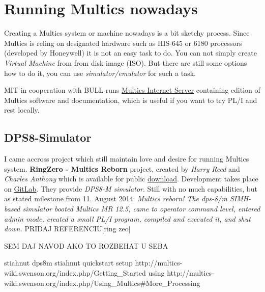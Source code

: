 \section{Running Multics nowadays}

Creating a Multics system or machine nowadays is a bit sketchy process. Since Multics is reling on designated hardware 
such as HIS-645 or 6180 processors (developed by Honeywell) it is not an easy task to do.
You can not simply create \textit{Virtual Machine} from from disk image (ISO). But there are still some options how to do it, 
you can use \textit{simulator/emulator} for such a task. 

MIT in cooperation with BULL runs \href{https://web.mit.edu/multics-history/source/Multics_Internet_Server/Multics_sources.html}{Multics Internet Server}
containing edition of Multics software and documentation, which is useful if you want to try PL/I and rest locally.


\subsection{DPS8-Simulator}

I came accross project which still maintain love and desire for running Multics system.
\textbf{RingZero - Multics Reborn} project, created by \textit{Harry Reed} and \textit{Charles Anthony} which is available for 
public \href{http://ringzero.wikidot.com/}{download}. Development takes place on \href{https://gitlab.com/dps8m/dps8m}{GitLab}. 
They provide \textit{DPS8-M simulator}. Still with no much capabilities, but as stated milestone from 11. August 2014:
\textit{Multics reborn! The dps-8/m SIMH-based simulator booted Multics MR 12.5, came to operator command level, entered 
admin mode, created a small PL/I program, compiled and executed it, and shut down.} PRIDAJ REFERENCIU[ring zeo]


SEM DAJ NAVOD AKO TO ROZBEHAT U SEBA

stiahnut dps8m
stiahnut quickstart 
setup http://multics-wiki.swenson.org/index.php/Getting_Started
using http://multics-wiki.swenson.org/index.php/Using_Multics#More_Processing

